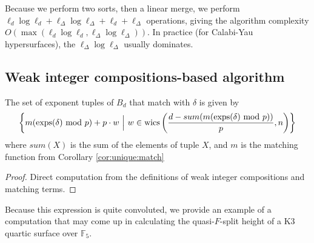Because we perform two sorts, then a linear merge, 
we perform 
$\ell_{d} \log \ell_{d} + \ell_{\Delta} \log \ell_{\Delta} + \ell_{d} + \ell_{\Delta}$ operations, 
giving the algorithm complexity 
$O(\max(\ell_{d} \log \ell_{d}, \ell_{\Delta} \log \ell_{\Delta}))$.
In practice (for Calabi-Yau hypersurfaces), 
the $\ell_{\Delta} \log \ell_{\Delta}$ usually dominates.

\subsection{Weak integer compositions-based algorithm}

\begin{lem}
    \label{lem:generate:matching}
    The set of exponent tuples of \(B_{d}\) that match with $\delta$ is given by 
    \[
        \left\{ m(\operatorname{exps}(\delta) \text{ mod } p) + p\cdot w ~\Big|~ w \in \operatorname{wics} 
        \left(\frac{d - sum(m(\operatorname{exps}(\delta) \text{ mod } p))}{p}, n \right) \right\}
    \]
    where $sum(X)$ is the sum of the elements of tuple $X$, and $m$ is the matching function from Corollary \ref{cor:unique:match}
\end{lem}

\begin{proof}
    Direct computation from the definitions of weak integer compositions and matching terms.
\end{proof}


Because this expression is quite convoluted, we 
provide an example of a computation 
that may come up in calculating the quasi-\(F\)-split 
height of a K3 quartic surface over $\mathbb{F}_5$.

